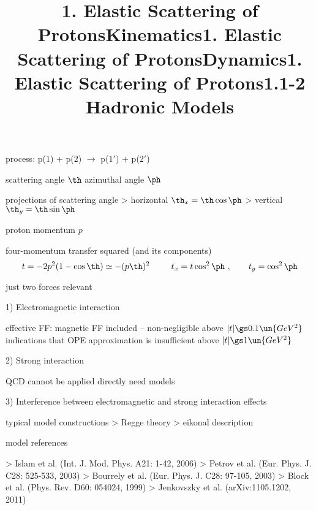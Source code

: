 

\newpage%
\title{1. Elastic Scattering of Protons\hfill Kinematics}

\> process: p($1$) + p($2$) $\longrightarrow$ p($1'$) + p($2'$)


\> scattering angle $\th$
\> azimuthal angle $\ph$

\> projections of scattering angle
\>> horizontal $\th_x = \th \cos\ph$
\>> vertical $\th_y = \th \sin\ph$

\> proton momentum $p$

\> four-momentum transfer squared (and its components)
$$t = -2p^2 (1 - \cos\th) \simeq -(p\th)^2\ \,\qquad t_x = t \cos^2\ph\ ,\qquad t_y = \cos^2\ph$$

\newpage%
\title{1. Elastic Scattering of Protons\hfill Dynamics}

\> just two forces relevant

1) Electromagnetic interaction

\> effective FF: magnetic FF included -- non-negligible above $|t|\gs 0.1\un{GeV^2}$
\> indications that OPE approximation is insufficient above $|t| \gs 1\un{GeV^2}$

\centerline{}
\centerline{}

2) Strong interaction

\> QCD cannot be applied directly
\> need models

3) Interference between electromagnetic and strong interaction effects

\newpage%
\title{1. Elastic Scattering of Protons\hfill 1.1-2 Hadronic Models}


\> typical model constructions
\>> Regge theory
\>> eikonal description

\> model references

\>> Islam et al. (Int. J. Mod. Phys. A21: 1-42, 2006)
\>> Petrov et al. (Eur. Phys. J. C28: 525-533, 2003)
\>> Bourrely et al. (Eur. Phys. J. C28: 97-105, 2003)
\>> Block et al. (Phys. Rev. D60: 054024, 1999)
\>> Jenkovszky et al. (arXiv:1105.1202, 2011)

